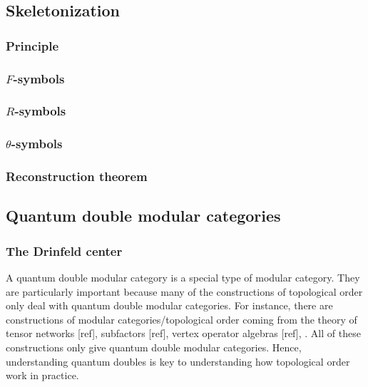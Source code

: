 \subsection{Skeletonization}
\label{skeletonization}

\subsubsection{Principle}


\subsubsection{$F$-symbols}

\subsubsection{$R$-symbols}

\subsubsection{$\theta$-symbols}

\subsubsection{Reconstruction theorem}



\subsection{Quantum double modular categories}

\subsubsection{The Drinfeld center}

A quantum double modular category is a special type of modular category. They are particularly important because many of the constructions of topological order only deal with quantum double modular categories. For instance, there are constructions of modular categories/topological order coming from the theory of tensor networks [ref], subfactors [ref], vertex operator algebras [ref], . All of these constructions only give quantum double modular categories. Hence, understanding quantum doubles is key to understanding how topological order work in practice.

